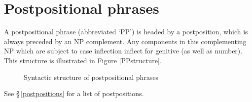 \section{Postpositional phrases}\label{postpositionalPhrases}
A postpositional phrase (abbreviated ‘PP’) is headed by a postposition, which is always preceded by an NP complement. Any components in this complementing NP which are subject to case inflection inflect for genitive (as well as number). This structure is illustrated in Figure \vref{PPstructure}. 
\begin{figure}
\caption{Syntactic structure of postpositional phrases}\label{PPstructure}
\end{figure}
See §\,\vref{postpositions} for a list of postpositions. 


